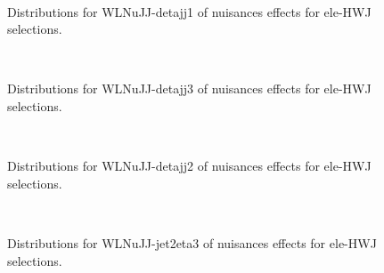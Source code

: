 \begin{figure}[htbp]  
\centering 
\\ 
\caption{ 
   Distributions for WLNuJJ-detajj1 of nuisances effects for ele-HWJ selections.
} 
\label{fig:WLNuJJ_detajj1_ele_HWJ} 
\end{figure} 




\begin{figure}[htbp]  
\centering 
\\ 
\caption{ 
   Distributions for WLNuJJ-detajj3 of nuisances effects for ele-HWJ selections.
} 
\label{fig:WLNuJJ_detajj3_ele_HWJ} 
\end{figure} 




\begin{figure}[htbp]  
\centering 
\\ 
\caption{ 
   Distributions for WLNuJJ-detajj2 of nuisances effects for ele-HWJ selections.
} 
\label{fig:WLNuJJ_detajj2_ele_HWJ} 
\end{figure} 




\begin{figure}[htbp]  
\centering 
\\ 
\caption{ 
   Distributions for WLNuJJ-jet2eta3 of nuisances effects for ele-HWJ selections.
} 
\label{fig:WLNuJJ_jet2eta3_ele_HWJ} 
\end{figure} 




